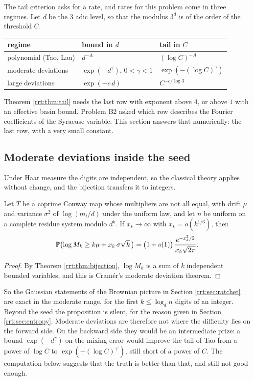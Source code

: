 The tail criterion asks for a rate, and rates for this problem come in three regimes. Let $d$ be the $3$ adic level, so that the modulus $3^d$ is of the order of the threshold $C$.

\begin{center}
\small
\begin{tabular}{lll}
\toprule
regime & bound in $d$ & tail in $C$\\
\midrule
polynomial (Tao, Lau) & $d^{-A}$ & $(\log C)^{-A}$\\
moderate deviations & $\exp(-d^{\gamma})$, $0<\gamma<1$ & $\exp(-(\log C)^{\gamma})$\\
large deviations & $\exp(-c\,d)$ & $C^{-c/\log 3}$\\
\bottomrule
\end{tabular}
\end{center}

Theorem \ref{rrt:thm:tail} needs the last row with exponent above $4$, or above $1$ with an effective basin bound. Problem B2 asked which row describes the Fourier coefficients of the Syracuse variable. This section answers that numerically: the last row, with a very small constant.

\subsection{Moderate deviations inside the seed}
Under Haar measure the digits are independent, so the classical theory applies without change, and the bijection transfers it to integers.

\begin{proposition}\label{rrt:prop:cramer}
Let $T$ be a coprime Conway map whose multipliers are not all equal, with drift $\mu$ and variance $\sigma^2$ of $\log(m_i/d)$ under the uniform law, and let $n$ be uniform on a complete residue system modulo $d^k$. If $x_k\to\infty$ with $x_k=o(k^{1/6})$, then
\[
\mathbb{P}\bigl(\log M_k\ge k\mu+x_k\,\sigma\sqrt{k}\,\bigr)=\bigl(1+o(1)\bigr)\,\frac{e^{-x_k^2/2}}{x_k\sqrt{2\pi}} .
\]
\end{proposition}

\begin{proof}
By Theorem \ref{rrt:thm:bijection}, $\log M_k$ is a sum of $k$ independent bounded variables, and this is Cram\'er's moderate deviation theorem.
\end{proof}

So the Gaussian statements of the Brownian picture in Section \ref{rrt:sec:ratchet} are exact in the moderate range, for the first $k\le\log_d n$ digits of an integer. Beyond the seed the proposition is silent, for the reason given in Section \ref{rrt:sec:entropy}. Moderate deviations are therefore not where the difficulty lies on the forward side. On the backward side they would be an intermediate prize: a bound $\exp(-d^\gamma)$ on the mixing error would improve the tail of Tao from a power of $\log C$ to $\exp(-(\log C)^{\gamma'})$, still short of a power of $C$. The computation below suggests that the truth is better than that, and still not good enough.

